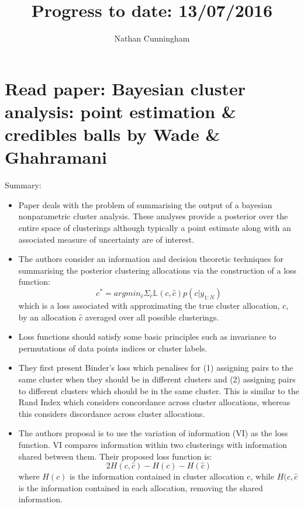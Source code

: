 \documentclass[10pt,a4paper,twoside]{article}
\author{Nathan Cunningham}
\title{Progress to date: 13/07/2016}
\begin{document}
\maketitle
\section{Read paper: Bayesian cluster analysis: point estimation \& credibles balls by Wade \& Ghahramani}
Summary:
\begin{itemize}
\item Paper\cite{wade2015bayesian} deals with the problem of summarising the output of a bayesian nonparametric cluster analysis. These analyses provide a posterior over the entire space of clusterings although typically a point estimate along with an associated measure of uncertainty are of interest.
\item The authors consider an information and decision theoretic techniques for summarising the posterior clustering allocations via the construction of a loss function:
\begin{equation}
c^{*} = argmin_{\hat{c}} \Sigma_{c} \mathbb{L}(c, \hat{c}) p(c|y_{1:N})
\end{equation}
which is a loss associated with approximating the true cluster allocation, c, by an allocation $\hat{c}$ averaged over all possible clusterings.
\item Loss functions should satisfy some basic principles such as invariance to permutations of data points indices or cluster labels.

\item They first present Binder's loss which penalises for (1) assigning pairs to the same cluster when they should be in different clusters and (2) assigning pairs to different clusters which should be in the same cluster. This is similar to the Rand Index which considers concordance across cluster allocations, whereas this considers discordance across cluster allocations.
\item The authors proposal is to use the variation of information (VI) as the loss function. VI compares information within two clusterings with information shared between them. Their proposed loss function is:
\begin{equation}
2H(c, \hat{c}) - H(c) - H(\hat{c})
\end{equation}
where $H(c)$ is the information contained in cluster allocation c, while $H(c, \hat{c}$ is the information contained in each allocation, removing the shared information.


\end{itemize}
\end{document}
